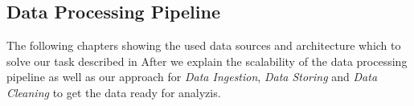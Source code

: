 \subsection{Data Processing Pipeline}
\label{subsec:pipeline}
The following chapters showing the used data sources and architecture which to solve our task described in 
After  we explain the scalability of the data processing pipeline as well as
our approach for \textit{Data Ingestion}, \textit{Data Storing} and \textit{Data Cleaning} to get the data ready for analyzis.


% 




